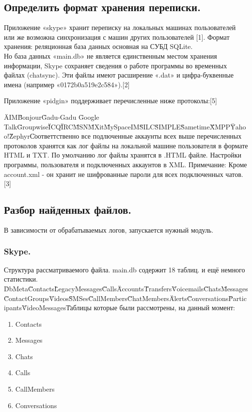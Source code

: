 
\subsection{Определить формат хранения переписки.}

Приложение «skype» хранит переписку на локальных машинах пользователей или же возможна синхронизация с машин других пользователей [1]. Формат хранения: реляционная база данных основная на СУБД SQLite.\\ 
Но база данных «main.db» не является единственным местом хранения информации, Skype сохраняет сведения о работе программы во временных файлах (chatsync). Эти файлы имеют расширение «.dat» и цифра-буквенные имена (например «0172b0a519e2c584»).[2]

Приложение «pidgin» поддерживает перечисленные ниже протоколы:[5]

\"AIM\"
\"Bonjour\"
\"Gadu-Gadu
\"Google Talk\"
\"Groupwise\"
\"ICQ\"
\"IRC\"
\"MSN\"
\"MXit\"
\"MySpaceIM\"
\"SILC\"
\"SIMPLE\"
\"Sametime\"
\"XMPP\"
\"Yahoo!\"
\"Zephyr\"

Соответтственно все подлюченные аккаунты всех выше перечисленных протоколов хранятся как лог файлы на локальной машине пользователя в формате HTML и TXT. По умолчанию лог файлы хранятся в .HTML файле. Настройки программы, пользователя и подключенных аккаунтов в XML.
Примечание: Кроме account.xml - он хранит не шифрованные пароли для всех подключенных чатов.[3]

\subsection{Разбор найденных файлов.}

В зависимости от обрабатываемых логов, запускается нужный модуль.\\ 
\subsubsection {Skype.}
Структура рассматриваемого файла.
main.db  содержит 18 таблиц. и ещё немного статистики.
\"DbMeta\"   
\"Contacts\"   
\"LegacyMessages\"
\"Calls\"     
\"Accounts\"   
\"Transfers\"   
\"Voicemails\"   
\"Chats\"      
\"Messages\"   
\"ContactGroups\"  
\"Videos\"   
\"SMSes\"
\"CallMembers\"   
\"ChatMembers\"   
\"Alerts\"
\"Conversations\"     
\"Participants\"   
\"VideoMessages\"

Таблицы которые были рассмотрены, на данный момент:    
 \begin{enumerate}
\item Contacts
\item Messages
\item Chats
\item Calls
\item CallMembers
\item Conversations
\end{enumerate}

